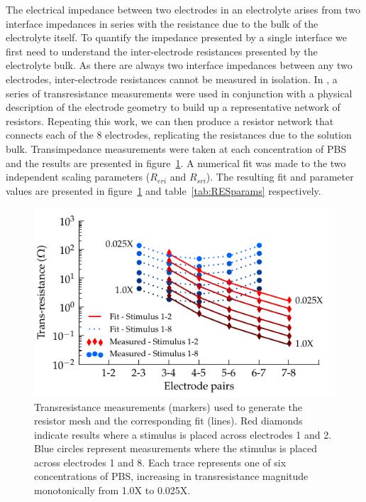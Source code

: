 \documentclass[journal, a4paper]{IEEEtran}
\begin{document}
The electrical impedance between two electrodes in an electrolyte arises from two interface impedances in series with the resistance due to the bulk of the electrolyte itself. To quantify the impedance presented by a single interface we first need to understand the inter-electrode resistances presented by the electrolyte bulk. As there are always two interface impedances between any two electrodes, inter-electrode resistances cannot be measured in isolation.
In \cite{ScottSingle2013}, a series of transresistance measurements were used in conjunction with a physical description of the electrode geometry to build up a representative network of resistors. Repeating this work, we can then produce a resistor network that connects each of the 8 electrodes, replicating the resistances due to the solution bulk. Transimpedance measurements were taken at each concentration of PBS and the results are presented in figure~\ref{fig:transresistance}.
A numerical fit was made to the two independent scaling parameters ($R_{eri}$ and $R_{sri}$).  The resulting fit and parameter values are presented in figure~\ref{fig:transresistance} and table~\ref{tab:RESparams} respectively.

\begin{figure}
    \begin{center}
        \includegraphics{graphics/pbs_transimpedance_IEEE}
    \end{center}
    \caption{Transresistance measurements (markers) used to generate the resistor mesh and the corresponding fit (lines). Red diamonds indicate results where a stimulus is placed across electrodes 1 and 2. Blue circles represent measurements where the stimulus is placed across electrodes 1 and 8. Each trace represents one of six concentrations of PBS, increasing in transresistance magnitude monotonically from 1.0X to 0.025X.}
    \label{fig:transresistance}
\end{figure}
\end{document}
